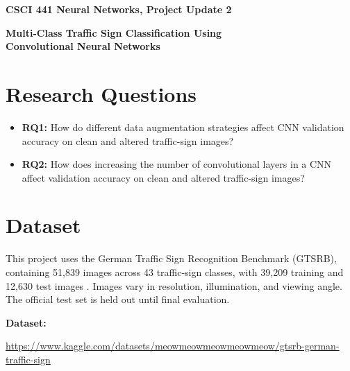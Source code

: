 \documentclass[11pt,letterpaper]{article}
\begin{document}
\noindent\hfill
{\footnotesize\bfseries CSCI 441 Neural Networks, Project Update 2}
\par

\vspace{1.5em}

\begin{center}
    {\Large\bfseries
    Multi-Class Traffic Sign Classification Using
    \\Convolutional Neural Networks\par}

    \vspace{0.5em}

\end{center}

\vspace{1em}


\vspace{1em}

\section*{Research Questions}

\begin{itemize}
    \item \textbf{RQ1:} How do different data augmentation strategies affect CNN validation accuracy on clean and altered traffic-sign images?
    \item \textbf{RQ2:} How does increasing the number of convolutional layers in a CNN affect validation accuracy on clean and altered traffic-sign images?
\end{itemize}

\section*{Dataset}
This project uses the German Traffic Sign Recognition Benchmark (GTSRB), containing 51,839 images across 43 traffic-sign classes, with 39,209 training and 12,630 test images \cite{stallkamp2011gtsrb}.
Images vary in resolution, illumination, and viewing angle.
The official test set is held out until final evaluation.

\smallskip

\noindent\textbf{Dataset: }\par
\noindent\url{https://www.kaggle.com/datasets/meowmeowmeowmeowmeow/gtsrb-german-traffic-sign}
\end{document}
